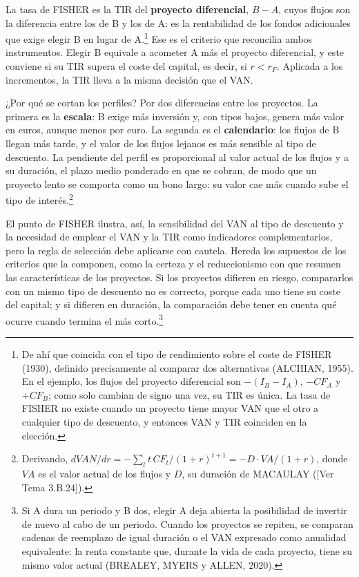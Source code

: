 \documentclass[10pt,a4paper]{article}
\newcommand{\authorfont}[1]{{\fontfamily{EBGaramond-TLF}\selectfont #1}}
\begin{document}
La tasa de FISHER es la TIR del \textbf{proyecto diferencial}, $B-A$, cuyos flujos son la diferencia entre los de B y los de A: es la rentabilidad de los fondos adicionales que exige elegir B en lugar de A.\footnote{%
    De ahí que coincida con el tipo de rendimiento sobre el coste de FISHER (1930), definido precisamente al comparar dos alternativas (ALCHIAN, 1955). En el ejemplo, los flujos del proyecto diferencial son $-(I_B-I_A)$, $-CF_A$ y $+CF_B$; como solo cambian de signo una vez, su TIR es única. La tasa de FISHER no existe cuando un proyecto tiene mayor VAN que el otro a cualquier tipo de descuento, y entonces VAN y TIR coinciden en la elección.
} Ese es el criterio que reconcilia ambos instrumentos. Elegir B equivale a acometer A más el proyecto diferencial, y este conviene si su TIR supera el coste del capital, es decir, si $r<r_F$. Aplicada a los incrementos, la TIR lleva a la misma decisión que el VAN.

¿Por qué se cortan los perfiles? Por dos diferencias entre los proyectos. La primera es la \textbf{escala}: B exige más inversión y, con tipos bajos, genera más valor en euros, aunque menos por euro. La segunda es el \textbf{calendario}: los flujos de B llegan más tarde, y el valor de los flujos lejanos es más sensible al tipo de descuento. La pendiente del perfil es proporcional al valor actual de los flujos y a su duración, el plazo medio ponderado en que se cobran, de modo que un proyecto lento se comporta como un bono largo: su valor cae más cuando sube el tipo de interés.\footnote{%
    Derivando, $dVAN/dr=-\sum_{t}t\,CF_t/(1+r)^{t+1}=-D\cdot VA/(1+r)$, donde $VA$ es el valor actual de los flujos y $D$, su duración de MACAULAY ([\authorfont{Ver Tema 3.B.24}]).
}

El punto de FISHER ilustra, así, la sensibilidad del VAN al tipo de descuento y la necesidad de emplear el VAN y la TIR como indicadores complementarios, pero la regla de selección debe aplicarse con cautela. Hereda los supuestos de los criterios que la componen, como la certeza y el reduccionismo con que resumen las características de los proyectos. Si los proyectos difieren en riesgo, compararlos con un mismo tipo de descuento no es correcto, porque cada uno tiene su coste del capital; y si difieren en duración, la comparación debe tener en cuenta qué ocurre cuando termina el más corto.\footnote{%
    Si A dura un periodo y B dos, elegir A deja abierta la posibilidad de invertir de nuevo al cabo de un periodo. Cuando los proyectos se repiten, se comparan cadenas de reemplazo de igual duración o el VAN expresado como anualidad equivalente: la renta constante que, durante la vida de cada proyecto, tiene su mismo valor actual (BREALEY, MYERS y ALLEN, 2020).
}
\end{document}
